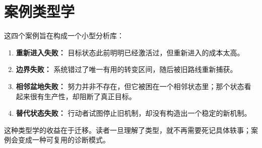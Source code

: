 \section{案例类型学}

这四个案例旨在构成一个小型分析库：
\begin{enumerate}[nosep]
  \item \textbf{重新进入失败：} 目标状态此前明明已经激活过，但重新进入的成本太高。
  \item \textbf{边界失败：} 系统错过了唯一有用的转变区间，随后被旧路线重新捕获。
  \item \textbf{相邻盆地失败：} 努力并非不存在，但它被困在一个相邻状态里；那个状态看起来很有生产性，却阻断了真正目标。
  \item \textbf{替代状态失败：} 行动者试图停止旧机制，却没有构造出一个稳定的新机制。
\end{enumerate}

这种类型学的收益在于迁移。读者一旦理解了类型，就不再需要死记具体轶事；案例会变成一种可复用的诊断模式。